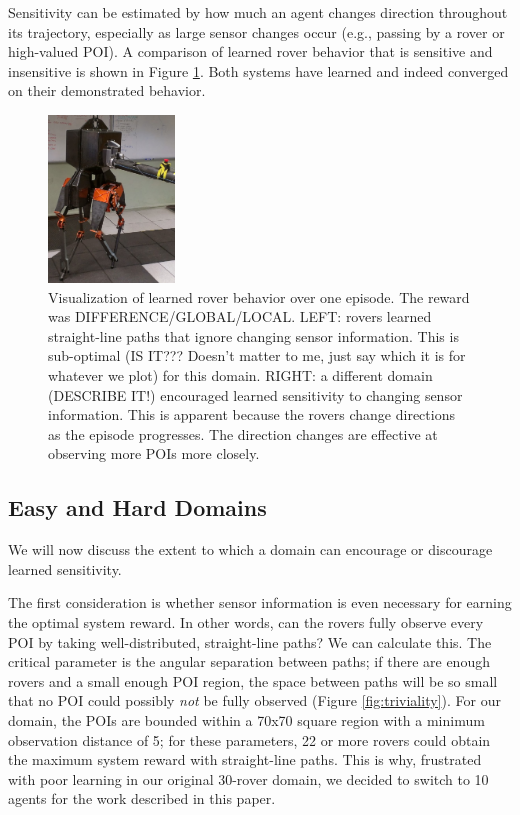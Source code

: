 \documentclass[letterpaper, 10 pt, conference]{ieeeconf}  %
\begin{document}
Sensitivity can be estimated by how much an agent changes direction throughout its trajectory, especially as large sensor changes occur (e.g., passing by a rover or high-valued POI). A comparison of learned rover behavior that is sensitive and insensitive is shown in Figure \ref{fig:sensitivity}. Both systems have learned and indeed converged on their demonstrated behavior. 

\begin{figure}[h!]
    \centering
    \includegraphics[width=0.3\textwidth]{ATRIAS.jpg}
    \caption{Visualization of learned rover behavior over one episode. The reward was DIFFERENCE/GLOBAL/LOCAL. LEFT: rovers learned straight-line paths that ignore changing sensor information. This is sub-optimal (IS IT??? Doesn't matter to me, just say which it is for whatever we plot) for this domain. RIGHT: a different domain (DESCRIBE IT!) encouraged learned sensitivity to changing sensor information. This is apparent because the rovers change directions as the episode progresses. The direction changes are effective at observing more POIs more closely. }
    \label{fig:sensitivity}
\end{figure}


\subsection{Easy and Hard Domains}
We will now discuss the extent to which a domain can encourage or discourage learned sensitivity. 

The first consideration is whether sensor information is even necessary for earning the optimal system reward. In other words, can the rovers fully observe every POI by taking well-distributed, straight-line paths? We can calculate this. The critical parameter is the angular separation between paths; if there are enough rovers and a small enough POI region, the space between paths will be so small that no POI could possibly \emph{not} be fully observed (Figure \ref{fig:triviality}). For our domain, the POIs are bounded within a 70x70 square region with a minimum observation distance of 5; for these parameters, 22 or more rovers could obtain the maximum system reward with straight-line paths. This is why, frustrated with poor learning in our original 30-rover domain, we decided to switch to 10 agents for the work described in this paper.
\end{document}
